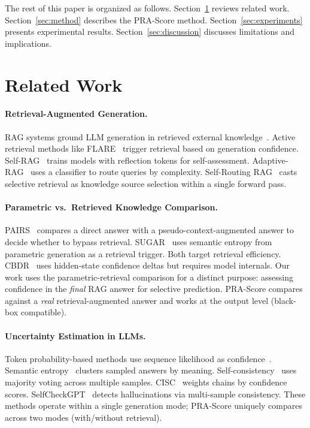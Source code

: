 \documentclass{article}
\begin{document}
The rest of this paper is organized as follows. Section~\ref{sec:related} reviews related work. Section~\ref{sec:method} describes the PRA-Score method. Section~\ref{sec:experiments} presents experimental results. Section~\ref{sec:discussion} discusses limitations and implications.

\section{Related Work}
\label{sec:related}

\paragraph{Retrieval-Augmented Generation.}
RAG systems ground LLM generation in retrieved external knowledge~\citep{lewis2020rag}. Active retrieval methods like FLARE~\citep{jiang2023active} trigger retrieval based on generation confidence. Self-RAG~\citep{asai2024selfrag} trains models with reflection tokens for self-assessment. Adaptive-RAG~\citep{jeong2024adaptiverag} uses a classifier to route queries by complexity. Self-Routing RAG~\citep{wu2025selfrouting} casts selective retrieval as knowledge source selection within a single forward pass.

\paragraph{Parametric vs.\ Retrieved Knowledge Comparison.}
PAIRS~\citep{chen2025pairs} compares a direct answer with a pseudo-context-augmented answer to decide whether to bypass retrieval. SUGAR~\citep{zubkova2025sugar} uses semantic entropy from parametric generation as a retrieval trigger. Both target retrieval efficiency. CBDR~\citep{ren2025cbdr} uses hidden-state confidence deltas but requires model internals. Our work uses the parametric-retrieval comparison for a distinct purpose: assessing confidence in the \emph{final} RAG answer for selective prediction. PRA-Score compares against a \emph{real} retrieval-augmented answer and works at the output level (black-box compatible).

\paragraph{Uncertainty Estimation in LLMs.}
Token probability-based methods use sequence likelihood as confidence~\citep{kadavath2022language}. Semantic entropy~\citep{kuhn2023semantic} clusters sampled answers by meaning. Self-consistency~\citep{wang2023selfconsistency} uses majority voting across multiple samples. CISC~\citep{taubenfeld2025cisc} weights chains by confidence scores. SelfCheckGPT~\citep{manakul2023selfcheckgpt} detects hallucinations via multi-sample consistency. These methods operate within a single generation mode; PRA-Score uniquely compares across two modes (with/without retrieval).
\end{document}
